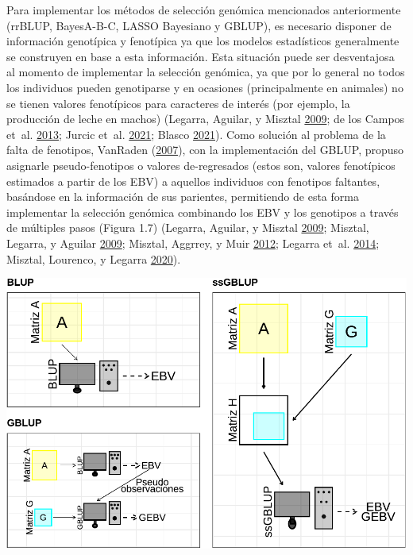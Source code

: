 \documentclass[11pt,spanish,a4paper,oneside,]{book} %
\begin{document}
Para implementar los métodos de selección genómica mencionados anteriormente (rrBLUP, BayesA-B-C, LASSO Bayesiano y GBLUP), es necesario disponer de información genotípica y fenotípica ya que los modelos estadísticos generalmente se construyen en base a esta información. Esta situación puede ser desventajosa al momento de implementar la selección genómica, ya que por lo general no todos los individuos pueden genotiparse y en ocasiones (principalmente en animales) no se tienen valores fenotípicos para caracteres de interés (por ejemplo, la producción de leche en machos) (Legarra, Aguilar, y Misztal \protect\hyperlink{ref-cite:17}{2009}; de los Campos et~al. \protect\hyperlink{ref-cite:31}{2013}; Jurcic et~al. \protect\hyperlink{ref-cite:11}{2021}; Blasco \protect\hyperlink{ref-cite:21}{2021}). Como solución al problema de la falta de fenotipos, VanRaden (\protect\hyperlink{ref-cite:39}{2007}), con la implementación del GBLUP, propuso asignarle pseudo-fenotipos o valores de-regresados (estos son, valores fenotípicos estimados a partir de los EBV) a aquellos individuos con fenotipos faltantes, basándose en la información de sus parientes, permitiendo de esta forma implementar la selección genómica combinando los EBV y los genotipos a través de múltiples pasos (Figura 1.7) (Legarra, Aguilar, y Misztal \protect\hyperlink{ref-cite:17}{2009}; Misztal, Legarra, y Aguilar \protect\hyperlink{ref-cite:16}{2009}; Misztal, Aggrrey, y Muir \protect\hyperlink{ref-cite:14}{2012}; Legarra et~al. \protect\hyperlink{ref-cite:15}{2014}; Misztal, Lourenco, y Legarra \protect\hyperlink{ref-cite:18}{2020}).

\begin{center}\includegraphics[width=1\linewidth]{figures/BLUPs} \end{center}
\end{document}
